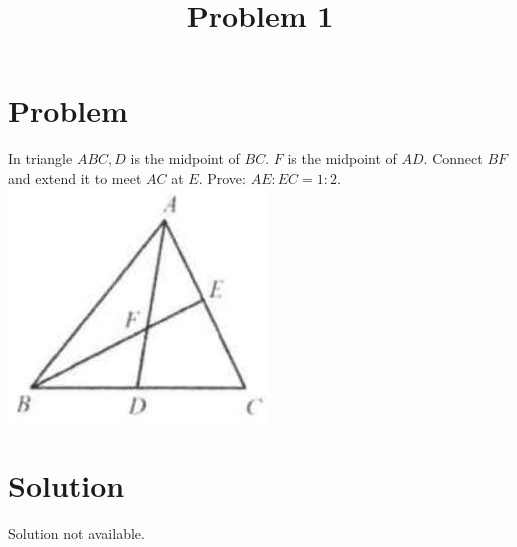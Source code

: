\documentclass{article}
\title{Problem 1}
\date{}
\begin{document}
\maketitle

\section*{Problem}
In triangle \(A B C, D\) is the midpoint of \(B C\). \(F\) is the midpoint of \(A D\). Connect \(B F\) and extend it to meet \(A C\) at \(E\). Prove: \(A E: E C=1: 2\).\\
\centering
\includegraphics[width=\textwidth]{images/126(3).jpg}

\section*{Solution}
Solution not available.
\end{document}
